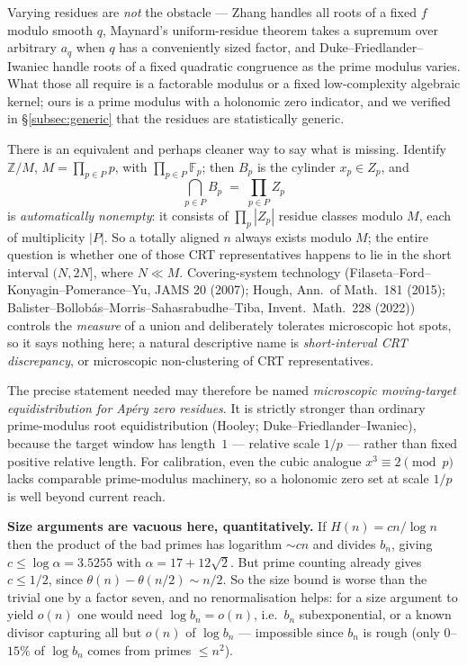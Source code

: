 Varying residues are \emph{not} the obstacle — Zhang handles all roots of a fixed $f$ modulo
smooth $q$, Maynard's uniform-residue theorem takes a supremum over arbitrary $a_q$ when $q$ has
a conveniently sized factor, and Duke--Friedlander--Iwaniec handle roots of a fixed quadratic
congruence as the prime modulus varies.  What those all require is a factorable modulus or a
fixed low-complexity algebraic kernel; ours is a prime modulus with a holonomic zero indicator,
and we verified in \S\ref{subsec:generic} that the residues are statistically generic.

There is an equivalent and perhaps cleaner way to say what is missing.  Identify
$\mathbb Z/M$, $M=\prod_{p\in P}p$, with $\prod_{p\in P}\mathbb F_p$; then $B_p$ is the cylinder
$x_p\in Z_p$, and
\[
  \bigcap_{p\in P}B_p\;=\;\prod_{p\in P}Z_p
\]
is \emph{automatically nonempty}: it consists of $\prod_p|Z_p|$ residue classes modulo $M$, each
of multiplicity $|P|$.  So a totally aligned $n$ always exists modulo $M$; the entire question is
whether one of those CRT representatives happens to lie in the short interval $(N,2N]$, where
$N\ll M$.  Covering-system technology (Filaseta--Ford--Konyagin--Pomerance--Yu, JAMS 20 (2007);
Hough, Ann.\ of Math.\ 181 (2015); Balister--Bollob\'as--Morris--Sahasrabudhe--Tiba, Invent.\
Math.\ 228 (2022)) controls the \emph{measure} of a union and deliberately tolerates microscopic
hot spots, so it says nothing here; a natural descriptive name is \emph{short-interval CRT
discrepancy}, or microscopic non-clustering of CRT representatives.

The precise statement needed may therefore be named \emph{microscopic moving-target
equidistribution for Ap\'ery zero residues}.  It is strictly stronger than ordinary
prime-modulus root equidistribution (Hooley; Duke--Friedlander--Iwaniec), because the target
window has length~$1$ — relative scale $1/p$ — rather than fixed positive relative length.  For
calibration, even the cubic analogue $x^3\equiv2\pmod p$ lacks comparable prime-modulus
machinery, so a holonomic zero set at scale $1/p$ is well beyond current reach.

\medskip
\noindent\textbf{Size arguments are vacuous here, quantitatively.}  If $H(n)=cn/\log n$ then the
product of the bad primes has logarithm $\sim cn$ and divides $b_n$, giving $c\le\log\alpha=3.5255$
with $\alpha=17+12\sqrt2$.  But prime counting already gives $c\le1/2$, since
$\theta(n)-\theta(n/2)\sim n/2$.  So the size bound is worse than the trivial one by a factor
seven, and no renormalisation helps: for a size argument to yield $o(n)$ one would need
$\log b_n=o(n)$, i.e.\ $b_n$ subexponential, or a known divisor capturing all but $o(n)$ of
$\log b_n$ — impossible since $b_n$ is rough (only $0$--$15\%$ of $\log b_n$ comes from primes
$\le n^2$).

